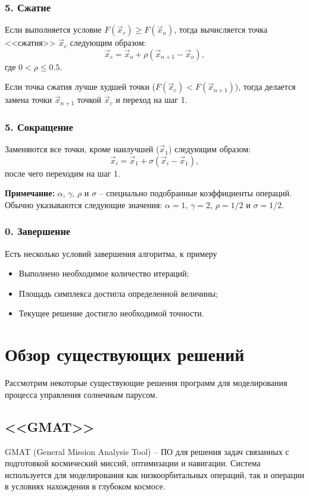 \subsubsection{5. Сжатие}
\noindent\indent Если выполняется условие $F(\vec{x}_r) \geq F(\vec{x}_n)$, тогда
вычисляется точка <<сжатия>> $\vec{x}_c$ следующим образом:
\begin{equation}
  \vec{x}_c = \vec{x}_o + \rho(\vec{x}_{n+1} - \vec{x}_o),
\end{equation}
где $0 < \rho \leq 0.5$.\par
  Если точка сжатия лучше худшей точки ($F(\vec{x}_c) < F(\vec{x}_{n+1})$),
тогда делается замена точки $\vec{x}_{n+1}$ точкой $\vec{x}_c$ и переход на шаг 1.
\subsubsection{5. Сокращение}
\noindent\indent Заменяются все точки, кроме наилучшей ($\vec{x}_1$) следующим образом:
\begin{equation}
  \vec{x}_i = \vec{x}_1 + \sigma(\vec{x}_i - \vec{x}_1),
\end{equation}
после чего переходим на шаг 1.\par
  \textbf{Примечание:} $\alpha$, $\gamma$, $\rho$ и $\sigma$ -- специально подобранные
коэффициенты операций. Обычно указываются следующие значения: $\alpha = 1$, $\gamma = 2$,
$\rho = 1/2$ и $\sigma = 1/2$.
\subsubsection{0. Завершение}
\noindent\indent Есть несколько условий завершения алгоритма, к примеру\par
\begin{itemize}
  \item Выполнено необходимое количество итераций;
  \item Площадь симплекса достигла определенной величины;
  \item Текущее решение достигло необходимой точности.
\end{itemize}
\section{Обзор существующих решений}
\noindent\indent Рассмотрим некоторые существующие решения программ для моделирования
процесса управления солнечным парусом.
\subsection{<<GMAT>>}
\noindent\indent GMAT (General Mission Analysis Tool) -- ПО для решения задач связанных
с подготовкой космический миссий, оптимизации и навигации. Система используется для
моделирования как низкоорбитальных операций, так и операции в условиях нахождения
в глубоком космосе.
